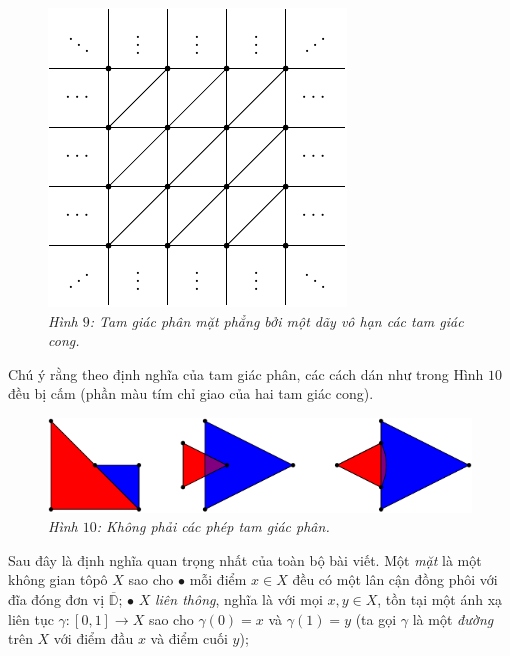 \begin{multicols}{2}
\begin{figure}[H]
		\vspace*{-5pt}
		\centering\captionsetup{labelformat=empty, justification=centering}
		\includegraphics[width=0.7\linewidth]{H9.pdf}
		\caption{\small\textit{\color{duongvaotoanhoc}Hình $9$: Tam giác phân mặt phẳng bởi một dãy vô hạn các tam giác cong.}}
		\vspace*{-10pt}
	\end{figure}
	Chú ý rằng theo định nghĩa của tam giác phân, các cách dán như trong Hình $10$ đều bị cấm (phần màu tím chỉ giao của hai tam giác cong).
	\begin{figure}[H]
		\vspace*{-5pt}
		\centering\captionsetup{labelformat=empty, justification=centering}
		\includegraphics[width=1\linewidth]{H10.pdf}
		\caption{\small\textit{\color{duongvaotoanhoc}Hình $10$: Không phải các phép tam giác phân.}}
		\vspace*{-10pt}
	\end{figure}
	Sau đây là định nghĩa quan trọng nhất của toàn bộ bài viết. Một {\it mặt} là một không gian tôpô $X$ sao cho
	\vskip 0.1cm
	$\bullet$ mỗi điểm $x \in X$ đều có một lân cận đồng phôi với đĩa đóng đơn vị $\overline{\mathbb{D}}$;
	\vskip 0.1cm
	$\bullet$ $X$ {\it liên thông}, nghĩa là với mọi $x, y \in X$, tồn tại một ánh xạ liên tục $\gamma: [0,1] \to X$ sao cho $\gamma(0) = x$ và $\gamma(1) = y$ (ta gọi $\gamma$ là một {\it đường} trên $X$ với điểm đầu $x$ và điểm cuối $y$);

\end{multicols}
